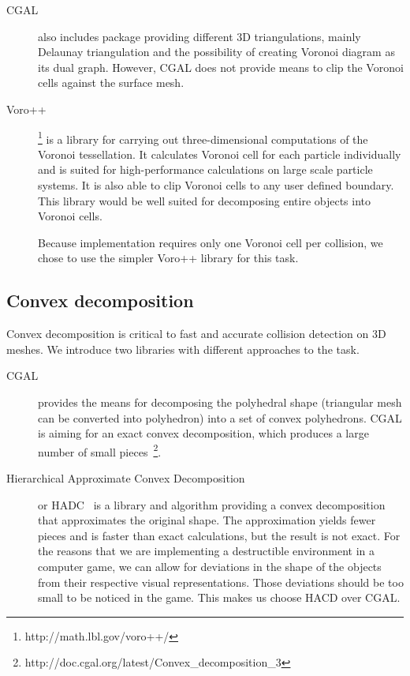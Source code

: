 \begin{description}
\item[CGAL] also includes package providing different 3D triangulations, mainly Delaunay triangulation and the possibility of creating Voronoi diagram as its dual graph. However, CGAL does not provide means to clip the Voronoi cells against the surface mesh.

\item[Voro++]\footnote{http://math.lbl.gov/voro++/} is a library for carrying out three-dimensional computations of the Voronoi tessellation. It calculates Voronoi cell for each particle individually and is suited for high-performance calculations on large scale particle systems. It is also able to clip Voronoi cells to any user defined boundary. This library would be well suited for decomposing entire objects into Voronoi cells. 

Because implementation requires only one Voronoi cell per collision, we chose to use the simpler Voro++ library for this task. 
\end{description}


\subsection{Convex decomposition}
\label{sec:decompositionLib}
Convex decomposition is critical to fast and accurate collision detection on 3D meshes. We introduce two libraries with different approaches to the task.
\begin{description}
\item[CGAL] provides the means for decomposing the polyhedral shape (triangular mesh can be converted into polyhedron) into a set of convex polyhedrons. CGAL is aiming for an exact convex decomposition, which produces a large number of small pieces~\footnote{http://doc.cgal.org/latest/Convex\_decomposition\_3}.

\item[Hierarchical Approximate Convex Decomposition] or HADC~\cite{HACD} is a library and algorithm providing a convex decomposition that approximates the original shape. The approximation yields fewer pieces and is faster than exact calculations, but the result is not exact. For the reasons that we are implementing a destructible environment in a computer game, we can allow for deviations in the shape of the objects from their respective visual representations. Those deviations should be too small to be noticed in the game. This makes us choose HACD over CGAL.
\end{description}

